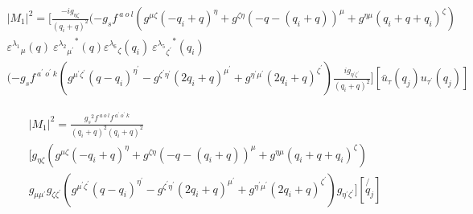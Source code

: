 \begin{equation}
\begin{split}
|M_1|^2=[\frac{-ig_{{\eta}{\zeta}}}{(q_i +q)^2}(-g_s f^{\:a\:o\:l}(g^{{\mu}{\zeta}}(-q_i +q)^{\eta}+g^{{\zeta}{\eta}}(-q-(q_i +q))^{\mu}+g^{{\eta}{\mu}}(q_i +q+q_i)^{\zeta})\\
{\varepsilon^{\lambda_1}}_{\mu} (q)\:{{\varepsilon^{\lambda_2}}_{{\mu}^{\prime}}}^* (q) {\varepsilon^{\lambda_6}}_{\zeta} (q_i)\:{{\varepsilon^{\lambda_5}}_{{\zeta}^{\prime}}}^* (q_i)\\
(-g_s f^{\:a^{\prime}\:o^{\prime}\:k}(g^{{{\mu}^{\prime}}{{\zeta}^{\prime}}}(q-q_i)^{{\eta}^{\prime}}-g^{{{\zeta}^{\prime}}{{\eta}^{\prime}}}(2q_i +q)^{{\mu}^{\prime}}+g^{{{\eta}^{\prime}}{{\mu}^{\prime}}}(2q_i +q)^{{\zeta}^{\prime}})\frac{ig_{{{\eta}^{\prime}}{{\zeta}^{\prime}}}}{(q_i +q)^2}][\bar{u}_{\tau}(q_j){u}_{{\tau}^{\prime}}(q_j)]
\end{split}
\end{equation}


\begin{equation}
\begin{split}
|M_1|^2=\frac{{g_s}^2 f^{\:a\:o\:l} f^{\:a^{\prime}\:o^{\prime}\:k}}{(q_i +q)^2 (q_i +q)^2}\\
[g_{{\eta}{\zeta}}(g^{{\mu}{\zeta}}(-q_i +q)^{\eta}+g^{{\zeta}{\eta}}(-q-(q_i +q))^{\mu}+g^{{\eta}{\mu}}(q_i +q+q_i)^{\zeta})\\
g_{{\mu}{{\mu}^{\prime}}} g_{{\zeta}{{\zeta}^{\prime}}}
(g^{{{\mu}^{\prime}}{{\zeta}^{\prime}}}(q-q_i)^{{\eta}^{\prime}}-g^{{{\zeta}^{\prime}}{{\eta}^{\prime}}}(2q_i +q)^{{\mu}^{\prime}}+g^{{{\eta}^{\prime}}{{\mu}^{\prime}}}(2q_i +q)^{{\zeta}^{\prime}})g_{{{\eta}^{\prime}}{{\zeta}^{\prime}}}][\not{q_j}]
\end{split}
\end{equation}
\pagebreak

